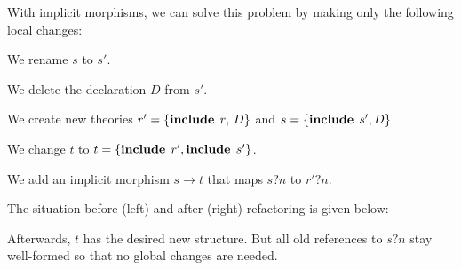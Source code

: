 With implicit morphisms, we can solve this problem by making only the following local changes:
\begin{compactenum}
  \item We rename $s$ to $s'$.
  \item We delete the declaration $D$ from $s'$.
  \item We create new theories $r'=\{\operatorname{\mathbf{include}}{\;r},\,D\}$ and $s=\{\operatorname{\mathbf{include}}{\;s'},D\}$.
  \item We change $t$ to $t=\{\operatorname{\mathbf{include}}{\;r'},\operatorname{\mathbf{include}}{\;s'}\}$.
  \item We add an implicit morphism $s\to t$ that maps $s?n$ to $r'?n$.
\end{compactenum}
The situation before (left) and after (right) refactoring is given below:
\begin{center}
\tb
{}
\end{center}
Afterwards, $t$ has the desired new structure.
But all old references to $s?n$ stay well-formed so that no global changes are needed.
